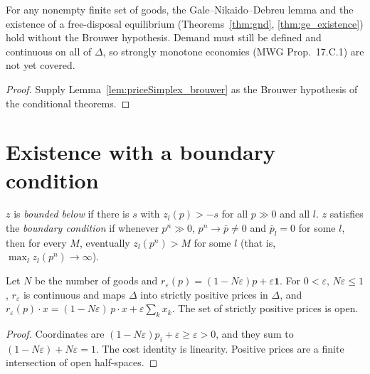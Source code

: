 \begin{theorem}
\label{thm:existence_unconditional}
\leanok
{}
For any nonempty finite set of goods, the Gale--Nikaido--Debreu lemma and the existence of a free-disposal equilibrium
(Theorems~\ref{thm:gnd}, \ref{thm:ge_existence}) hold without the Brouwer hypothesis. Demand must still be defined and
continuous on all of $\Delta$, so strongly monotone economies (MWG Prop.~17.C.1) are not yet covered.
\end{theorem}
\begin{proof}
\leanok
Supply Lemma~\ref{lem:priceSimplex_brouwer} as the Brouwer hypothesis of the conditional theorems.
\end{proof}

\section{Existence with a boundary condition}
\label{sec:existence_boundary}

\begin{definition}
\label{def:boundary_condition}
\leanok
$z$ is \emph{bounded below} if there is $s$ with $z_l(p) > -s$ for all $p \gg 0$ and all $l$. $z$ satisfies the
\emph{boundary condition} if whenever $p^n \gg 0$, $p^n \to \bar p \ne 0$ and $\bar p_l = 0$ for some $l$, then for every
$M$, eventually $z_l(p^n) > M$ for some $l$ (that is, $\max_l z_l(p^n) \to \infty$).
\end{definition}

\begin{lemma}
\label{lem:shrink_price}
\leanok
{}
Let $N$ be the number of goods and $r_\varepsilon(p) = (1 - N\varepsilon)p + \varepsilon \mathbf 1$. For $0 < \varepsilon$,
$N\varepsilon \le 1$, $r_\varepsilon$ is continuous and maps $\Delta$ into strictly positive prices in $\Delta$, and
$r_\varepsilon(p) \cdot x = (1 - N\varepsilon)\, p \cdot x + \varepsilon \sum_k x_k$. The set of strictly positive prices
is open.
\end{lemma}
\begin{proof}
\leanok
Coordinates are $(1 - N\varepsilon)p_i + \varepsilon \ge \varepsilon > 0$, and they sum to $(1 - N\varepsilon) + N\varepsilon = 1$.
The cost identity is linearity. Positive prices are a finite intersection of open half-spaces.
\end{proof}

